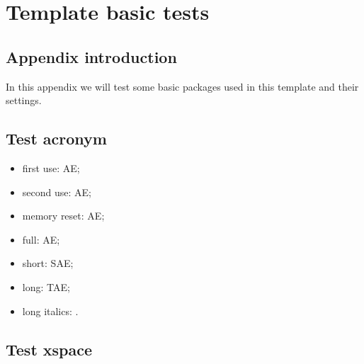 \chapter{Template basic tests}
\label{appendix:basic-tests}
\acresetall

\section{Appendix introduction}

In this appendix we will test some basic packages used in this template and their settings.

\section{Test acronym}

\begin{itemize}
\item first use: \ac{AE};
\item second use: \ac{AE};
\item memory reset: \acresetall \ac{AE};
\item full: \acf{AE};
\item short: \acs{SAE};
\item long: \acl{TAE};
\item long italics: .
\end{itemize}

\section{Test xspace}

